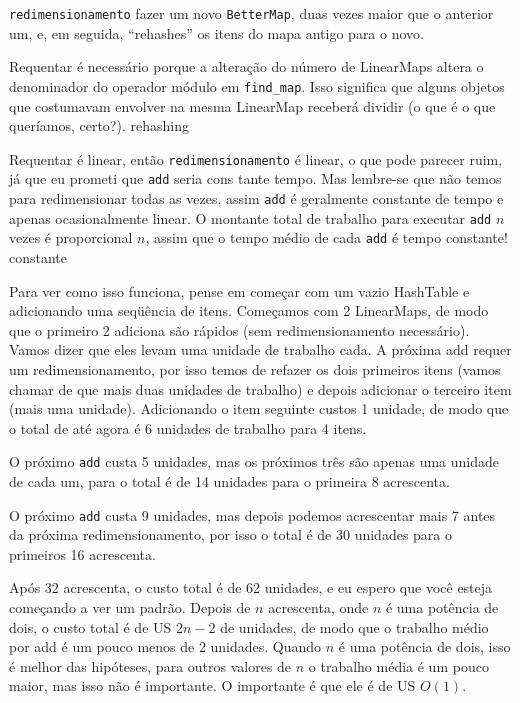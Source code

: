 \documentclass[10pt]{book}
\begin{document}
\begin{exercise}
\begin{v erbatim}
{\tt redimensionamento} fazer um novo {\tt BetterMap}, duas vezes maior que o anterior
um, e, em seguida, ``rehashes'' os itens do mapa antigo para o novo.

Requentar é necessário porque a alteração do número de LinearMaps
altera o denominador do operador módulo em
\Verb "find_map". Isso significa que alguns objetos que costumavam
envolver na mesma LinearMap receberá dividir (o que é
o que queríamos, certo?).
\index{} rehashing

Requentar é linear, então
{\tt redimensionamento} é linear, o que pode parecer ruim, já que eu prometi
que {\tt add} seria cons tante tempo. Mas lembre-se que
não temos para redimensionar todas as vezes, assim {\tt add} é geralmente
constante de tempo e apenas ocasionalmente linear. O montante total
de trabalho para executar {\tt add} $ n $ vezes é proporcional $ n $,
assim que o tempo médio de cada {\tt add} é tempo constante!
 constante

Para ver como isso funciona, pense em começar com um vazio
HashTable e adicionando uma seqüência de itens. Começamos com 2 LinearMaps,
de modo que o primeiro 2 adiciona são rápidos (sem redimensionamento necessário). Vamos
dizer que eles levam uma unidade de trabalho cada. A próxima add
requer um redimensionamento, por isso temos de refazer os dois primeiros
itens (vamos chamar de que mais duas unidades de trabalho) e depois
adicionar o terceiro item (mais uma unidade). Adicionando o item seguinte
custos 1 unidade, de modo que o total de até agora é
6 unidades de trabalho para 4 itens.

O próximo {\tt add} custa 5 unidades, mas os próximos três
são apenas uma unidade de cada um, para o total é de 14 unidades para o
primeira 8 acrescenta.

O próximo {\tt add} custa 9 unidades, mas depois podemos acrescentar mais 7
antes da próxima redimensionamento, por isso o total é de 30 unidades para o
primeiros 16 acrescenta.

Após 32 acrescenta, o custo total é de 62 unidades, e eu espero que você esteja começando
a ver um padrão. Depois de $ n $ acrescenta, onde $ n $ é uma potência de dois, o
custo total é de US $ 2n-2 $ de unidades, de modo que o trabalho médio por add é
um pouco menos de 2 unidades. Quando $ n $ é uma potência de dois, isso é
melhor das hipóteses, para outros valores de $ n $ o trabalho média é um pouco
maior, mas isso não é importante. O importante é que ele
é de US $ O (1) $.


\end{v erbatim}
\end{exercise}
\end{document}
